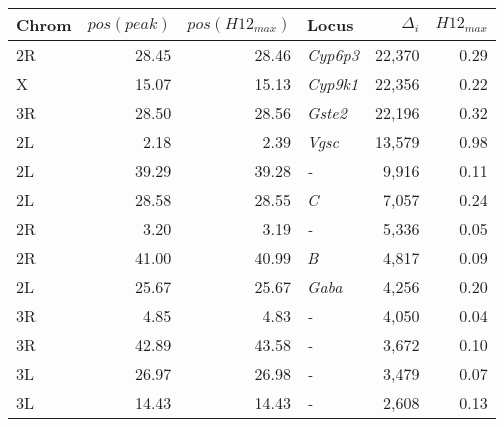 \begin{tabular}{lrrlrr}
\toprule
Chrom & $pos(peak)$ & $pos(H12_{max})$ &            Locus & $\Delta_{i}$ & $H12_{max}$ \\
\midrule
   2R &       28.45 &            28.46 &  \textit{Cyp6p3} &       22,370 &        0.29 \\
    X &       15.07 &            15.13 &  \textit{Cyp9k1} &       22,356 &        0.22 \\
   3R &       28.50 &            28.56 &   \textit{Gste2} &       22,196 &        0.32 \\
   2L &        2.18 &             2.39 &    \textit{Vgsc} &       13,579 &        0.98 \\
   2L &       39.29 &            39.28 &       \textit{-} &        9,916 &        0.11 \\
   2L &       28.58 &            28.55 &       \textit{C} &        7,057 &        0.24 \\
   2R &        3.20 &             3.19 &       \textit{-} &        5,336 &        0.05 \\
   2R &       41.00 &            40.99 &       \textit{B} &        4,817 &        0.09 \\
   2L &       25.67 &            25.67 &    \textit{Gaba} &        4,256 &        0.20 \\
   3R &        4.85 &             4.83 &       \textit{-} &        4,050 &        0.04 \\
   3R &       42.89 &            43.58 &       \textit{-} &        3,672 &        0.10 \\
   3L &       26.97 &            26.98 &       \textit{-} &        3,479 &        0.07 \\
   3L &       14.43 &            14.43 &       \textit{-} &        2,608 &        0.13 \\
\bottomrule
\end{tabular}
